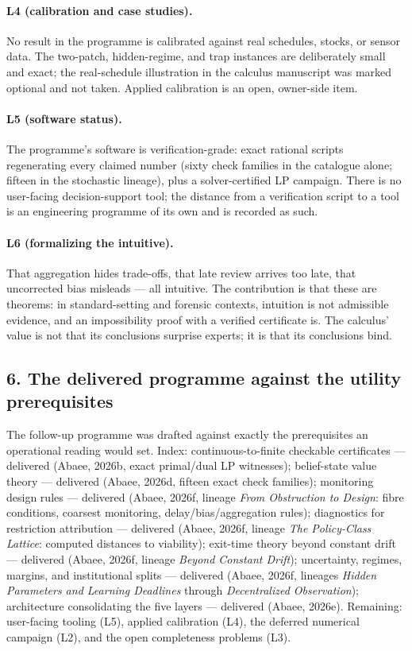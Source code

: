 \documentclass[10pt,twocolumn]{article}
\theoremstyle{definition}
\begin{document}
\paragraph{L4 (calibration and case studies).}
No result in the programme is calibrated against real schedules, stocks,
or sensor data. The two-patch, hidden-regime, and trap instances are
deliberately small and exact; the real-schedule illustration in the
calculus manuscript was marked optional and not taken. Applied
calibration is an open, owner-side item.

\paragraph{L5 (software status).}
The programme's software is verification-grade: exact rational scripts
regenerating every claimed number (sixty check families in the catalogue alone; fifteen in the stochastic lineage), plus a solver-certified LP
campaign. There is no user-facing decision-support tool; the distance
from a verification script to a tool is an engineering programme of its
own and is recorded as such.

\paragraph{L6 (formalizing the intuitive).}
That aggregation hides trade-offs, that late review arrives too late,
that uncorrected bias misleads --- all intuitive. The contribution is that
these are theorems: in standard-setting and forensic contexts, intuition
is not admissible evidence, and an impossibility proof with a verified
certificate is. The calculus' value is not that its conclusions surprise
experts; it is that its conclusions bind.

\subsection{6. The delivered programme against the utility prerequisites}\label{delivered}

The follow-up programme was drafted against exactly the prerequisites an
operational reading would set. Index: continuous-to-finite checkable
certificates --- delivered (Abaee, 2026b, exact primal/dual LP witnesses);
belief-state value theory --- delivered (Abaee, 2026d, fifteen exact
check families); monitoring design rules --- delivered (Abaee, 2026f, lineage \emph{From Obstruction to Design}:
fibre conditions, coarsest monitoring, delay/bias/aggregation rules);
diagnostics for restriction attribution --- delivered (Abaee, 2026f, lineage \emph{The Policy-Class Lattice}: computed distances to viability);
exit-time theory beyond constant drift --- delivered (Abaee, 2026f, lineage \emph{Beyond Constant Drift});
uncertainty, regimes, margins, and institutional splits --- delivered
(Abaee, 2026f, lineages \emph{Hidden Parameters and Learning Deadlines} through \emph{Decentralized Observation}); architecture consolidating the five layers ---
delivered (Abaee, 2026e). Remaining: user-facing tooling (L5), applied
calibration (L4), the deferred numerical campaign (L2), and the open
completeness problems (L3).
\end{document}
